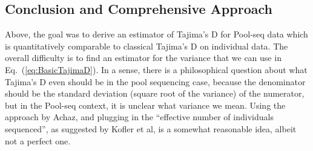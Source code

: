\documentclass[letterpaper,fontsize=9pt,DIV=12]{scrartcl}
\newcounter{todo}
\newcommand\todo[1]{}
\newcommand\toolname{\textsc}
\newcommand\eqnref[1]{Eq.~(\ref{#1})}
\begin{document}





\subsection{Conclusion and Comprehensive Approach}
\label{supp:sec:TajimaD:sub:RealDeal}

Above, the goal was to derive an estimator of Tajima's D for Pool-seq data which is quantitatively comparable to classical Tajima's D on individual data.  The overall difficulty is to find an estimator for the variance that we can use in \eqnref{eq:BasicTajimaD}.  
In a sense, there is a philosophical question about what Tajima's D even should be in the pool sequencing case, because the denominator should be the standard deviation (square root of the variance) of the numerator, but in the Pool-seq context, it is unclear what variance we mean.  Using the approach by Achaz, and plugging in the ``effective number of individuals sequenced'', as suggested by Kofler et al, is a somewhat reasonable idea, albeit not a perfect one. 

\end{document}
